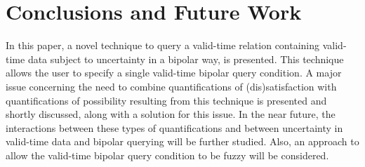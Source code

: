 \documentclass[runningheads,a4paper]{llncs}
\begin{document}
\section{Conclusions and Future Work\label{sec:conclusions}}
In this paper, a novel technique to query a valid-time relation containing valid-time data subject to uncertainty in a bipolar way, is presented. This technique allows the user to specify a single valid-time bipolar query condition. A major issue concerning the need to combine quantifications of (dis)satisfaction with quantifications of possibility resulting from this technique is presented and shortly discussed, along with a solution for this issue. In the near future, the interactions between these types of quantifications and between uncertainty in valid-time data and bipolar querying will be further studied. Also, an approach to allow the valid-time bipolar query condition to be fuzzy will be considered.

\vspace{-10pt}



\end{document}
